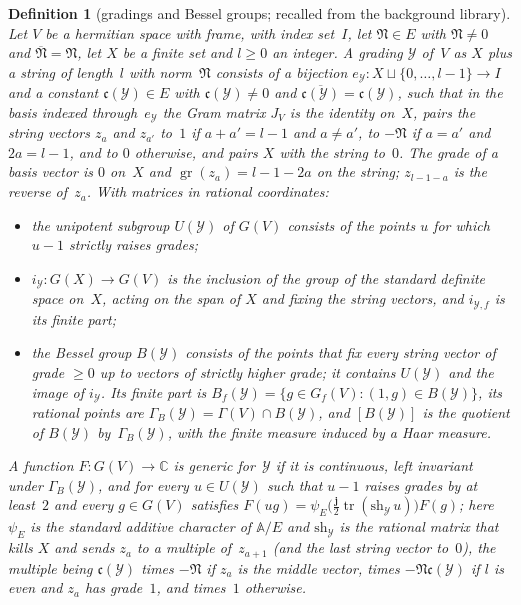 \documentclass[11pt,a4paper]{article}
\newcommand{\m}[1]{\mbox{$#1$}}        %
\theoremstyle{plainx}
\theoremstyle{uprightx}
\newtheorem{definition}[theorem]{Definition}
\newcommand{\CC}{\mathbb{C}}
\newcommand{\Ad}{\mathbb{A}}
\newcommand{\cj}[1]{\overline{#1}}
\newcommand{\gr}{\operatorname{gr}}
\newcommand{\Bes}[1]{B(#1)}                        %
\newcommand{\Besf}[1]{B_f(#1)}
\newcommand{\Besr}[1]{\Gamma_B(#1)}                %
\newcommand{\Uni}[1]{U(#1)}                        %
\newcommand{\incl}[1]{i_{#1}}                      %
\newcommand{\inclf}[1]{i_{#1,f}}
\newcommand{\cst}[1]{\mathfrak{c}(#1)}             %
\begin{document}
\begin{definition}[gradings and Bessel groups; recalled from the background library]\label{d:grading}
Let $V$ be a hermitian space with frame, with index set~$I$, let \m{\mathfrak{N}\in E} with \m{\mathfrak{N}\ne0} and \m{\cj{\mathfrak{N}}=\mathfrak{N}}, let
$X$ be a finite set and \m{l\ge0} an integer. A \emph{grading} $\mathcal{Y}$ of~$V$ as \emph{$X$ plus a string of
length~$l$ with norm~$\mathfrak{N}$} consists of a bijection $e_{\mathcal{Y}}\colon X\sqcup\{0,\dots,l-1\}\to I$ and a
constant \m{\cst{\mathcal{Y}}\in E} with \m{\cst{\mathcal{Y}}\ne0} and $\cj{\cst{\mathcal{Y}}}=\cst{\mathcal{Y}}$,
such that in the basis indexed through~$e_{\mathcal{Y}}$ the Gram matrix $J_V$ is the identity on~$X$, pairs the
string vectors $z_a$ and $z_{a'}$ to~$1$ if \m{a+a'=l-1} and \m{a\ne a'}, to \m{-\mathfrak{N}} if \m{a=a'} and \m{2a=l-1}, and to
$0$ otherwise, and pairs $X$ with the string to~$0$. The \emph{grade} of a basis vector is $0$ on~$X$ and
\m{\gr(z_a)=l-1-2a} on the string; $z_{l-1-a}$ is the \emph{reverse} of~$z_a$. With matrices in rational
coordinates:
\begin{itemize}
\item the \emph{unipotent subgroup} $\Uni{\mathcal{Y}}$ of $G(V)$ consists of the points $u$ for which \m{u-1}
  strictly raises grades;
\item $\incl{\mathcal{Y}}\colon G(X)\to G(V)$ is the inclusion of the group of the standard definite space on~$X$,
  acting on the span of $X$ and fixing the string vectors, and $\inclf{\mathcal{Y}}$ is its finite part;
\item the \emph{Bessel group} $\Bes{\mathcal{Y}}$ consists of the points that fix every string vector of grade
  \m{\ge0} up to vectors of strictly higher grade; it contains $\Uni{\mathcal{Y}}$ and the image of
  $\incl{\mathcal{Y}}$. Its finite part is $\Besf{\mathcal{Y}}=\{g\in G_f(V):(1,g)\in\Bes{\mathcal{Y}}\}$, its
  rational points are $\Besr{\mathcal{Y}}=\Gamma(V)\cap\Bes{\mathcal{Y}}$, and \m{[\Bes{\mathcal{Y}}]} is the
  quotient of $\Bes{\mathcal{Y}}$ by~$\Besr{\mathcal{Y}}$, with the finite measure induced by a Haar measure.
\end{itemize}
A function $F\colon G(V)\to\CC$ is \emph{generic for~$\mathcal{Y}$} if it is continuous, left invariant under
$\Besr{\mathcal{Y}}$, and for every \m{u\in\Uni{\mathcal{Y}}} such that \m{u-1} raises grades by at least~$2$ and
every \m{g\in G(V)} satisfies $F(ug)=\psi_E\bigl(\tfrac{\mathbf{j}}2\operatorname{tr}(\mathrm{sh}_{\mathcal{Y}}\,u)\bigr)F(g)$;
here $\psi_E$ is the standard additive character of \m{\Ad/E} and $\mathrm{sh}_{\mathcal{Y}}$ is the rational
matrix that kills $X$ and sends $z_a$ to a multiple of~$z_{a+1}$ (and the last string vector to~$0$), the multiple
being $\cst{\mathcal{Y}}$ times \m{-\mathfrak{N}} if $z_a$ is the middle vector, times \m{-\mathfrak{N}\cst{\mathcal{Y}}} if $l$ is even and
$z_a$ has grade~$1$, and times~$1$ otherwise.
\end{definition}
\end{document}
